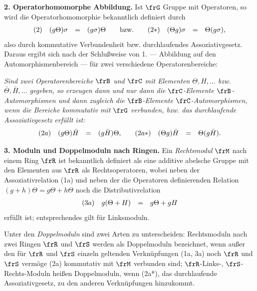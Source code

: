 \noindent\textbf{2. Operatorhomomorphe Abbildung.} Ist \(\frG\) Gruppe mit Operatoren, so wird die Operatorhomomorphie bekanntlich definiert durch
\[
        \begin{array}{r@{\quad}c@{\quad}c@{\quad}c@{\qquad}c@{\qquad}r@{\quad}c@{\quad}c@{\quad}c}
        (2) & (g\Theta)\sigma &=& (g\sigma)\Theta
        & \text{bzw.} &
        (2*) & (\Theta g)\sigma &=& \Theta(g\sigma),
        \end{array}
\]
also durch kommutative Verbundenheit bzw. durchlaufendes Assoziativgesetz. Daraus ergibt sich nach der Schlußweise von 1. --- Abbildung auf den Automorphismenbereich --- für zwei verschiedene Operatorenbereiche:

\emph{Sind zwei Operatorenbereiche \(\frB\) und \(\frC\) mit Elementen \(\Theta,H,\ldots\) bzw. \(\bar\Theta,\bar H,\ldots\) gegeben, so erzeugen dann und nur dann die \(\frC\)-Elemente \(\frB\)-Automorphismen und dann zugleich die \(\frB\)-Elemente \(\frC\)-Automorphismen, wenn die Bereiche kommutativ mit \(\frG\) verbunden, bzw. das durchlaufende Assoziativgesetz erfüllt ist:}
\[
        \begin{array}{r@{\quad}c@{\quad}c@{\quad}c@{\qquad}r@{\quad}c@{\quad}c@{\quad}c}
        (2a) & (g\Theta)\bar H &=& (g\bar H)\Theta, &
        (2a*) & (\Theta g)\bar H &=& \Theta(g\bar H).
        \end{array}
\]

\noindent\textbf{3. Moduln und Doppelmoduln nach Ringen.} Ein \emph{Rechtsmodul} \(\frM\) nach einem Ring \(\frR\) ist bekanntlich definiert als eine additive abelsche Gruppe mit den Elementen aus \(\frR\) als Rechtsoperatoren, wobei neben der Assoziativrelation (1a) und neben der die Operatoren definierenden Relation \((g+h)\Theta=g\Theta+h\Theta\) noch die Distributivrelation
\[
        \begin{array}{r@{\quad}c@{\quad}c@{\quad}c}
        (3a) & g(\Theta+H) &=& g\Theta+gH
        \end{array}
\]
erfüllt ist; entsprechendes gilt für Linksmoduln.

Unter den \emph{Doppelmoduln} sind zwei Arten zu unterscheiden: Rechtsmoduln nach zwei Ringen \(\frR\) und \(\frS\) werden als Doppelmoduln bezeichnet, wenn außer den für \(\frR\) und \(\frS\) einzeln geltenden Verknüpfungen (1a, 3a) noch \(\frR\) und \(\frS\) vermöge (2a) kommutativ mit \(\frM\) verbunden sind; \(\frR\)-Links-, \(\frS\)-Rechts-Moduln heißen Doppelmoduln, wenn (2a*), das durchlaufende Assoziativgesetz, zu den anderen Verknüpfungen hinzukommt.

